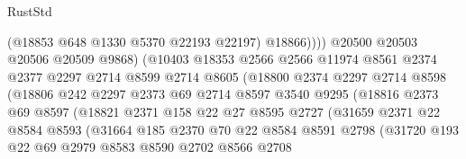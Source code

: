 \begin{lexlean}{RustStd}
\begin{coremodule}
                                  (@18853 @648 @1330 @5370 @22193 @22197)
                                  @18866))))
                          @20500
                          @20503
                          @20506
                          @20509
                          @9868)
                        (@10403
                          @18353
                          @2566
                          @2566
                          @11974
                          @8561
                          @2374
                          @2377
                          @2297
                          @2714
                          @8599
                          @2714
                          @8605
                          (@18800
                            @2374
                            @2297
                            @2714
                            @8598
                            (@18806
                              @242
                              @2297
                              @2373
                              @69
                              @2714
                              @8597
                              @3540
                              @9295
                              (@18816
                                @2373
                                @69
                                @8597
                                (@18821
                                  @2371
                                  @158
                                  @22
                                  @27
                                  @8595
                                  @2727
                                  (@31659
                                    @2371
                                    @22
                                    @8584
                                    @8593
                                    (@31664
                                      @185
                                      @2370
                                      @70
                                      @22
                                      @8584
                                      @8591
                                      @2798
                                      (@31720
                                        @193
                                        @22
                                        @69
                                        @2979
                                        @8583
                                        @8590
                                        @2702
                                        @8566
                                        @2708

\end{coremodule}
\end{lexlean}

